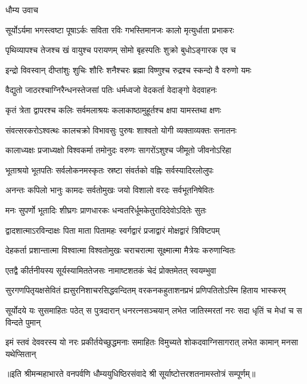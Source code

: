 

धौम्य उवाच

\twolineshloka
{सूर्योऽर्यमा भगस्त्वष्टा पूषाऽर्कः सविता रविः}
{गभस्तिमानजः कालो मृत्युर्धाता प्रभाकरः}

\twolineshloka
{पृथिव्यापश्च तेजश्च खं वायुश्च परायणम्}
{सोमो बृहस्पतिः शुक्रो बुधोऽङ्गारक एव च}

\twolineshloka
{इन्द्रो विवस्वान् दीप्तांशुः शुचिः शौरिः शनैश्चरः}
{ब्रह्मा विष्णुश्च रुद्रश्च स्कन्दो वै वरुणो यमः}

\twolineshloka
{वैद्युतो जाठरश्चाग्निरैन्धनस्तेजसां पतिः}
{धर्मध्वजो वेदकर्ता वेदाङ्गो वेदवाहनः}

\twolineshloka
{कृतं त्रेता द्वापरश्च कलिः सर्वमलाश्रयः}
{कलाकाष्ठामुहूर्तश्च क्षपा यामस्तथा क्षणः}

\twolineshloka
{संवत्सरकरोऽश्वत्थः कालचक्रो विभावसुः}
{पुरुषः शाश्वतो योगी व्यक्ताव्यक्तः सनातनः}

\twolineshloka
{कालाध्यक्षः प्रजाध्यक्षो विश्वकर्मा तमोनुदः}
{वरुणः सागरोंऽशुश्च जीमूतो जीवनोऽरिहा}

\twolineshloka
{भूताश्रयो भूतपतिः सर्वलोकनमस्कृतः}
{स्रष्टा संवर्तको वह्निः सर्वस्यादिरलोलुपः}

\twolineshloka
{अनन्तः कपिलो भानुः कामदः सर्वतोमुखः}
{जयो विशालो वरदः सर्वभूतनिषेवितः}

\twolineshloka
{मनः सुपर्णो भूतादिः शीघ्रगः प्राणधारकः}
{धन्वतरिर्धूमकेतुरादिदेवोऽदितेः सुतः}

\twolineshloka
{द्वादशात्माऽरविन्दाक्षः पिता माता पितामहः}
{स्वर्गद्वारं प्रजाद्वारं मोक्षद्वारं त्रिविष्टपम्}

\twolineshloka
{देहकर्ता प्रशान्तात्मा विश्वात्मा विश्वतोमुखः}
{चराचरात्मा सूक्ष्मात्मा मैत्रेयः करुणान्वितः}

\twolineshloka
{एतद्वै कीर्तनीयस्य सूर्यस्यामिततेजसः}
{नामाष्टशतकं चेदं प्रोक्तमेतत् स्वयम्भुवा}

\twolineshloka
{सुरगणपितृयक्षसेवितं ह्यसुरनिशाचरसिद्धवन्दितम्}
{वरकनकहुताशनप्रभं प्रणिपतितोऽस्मि हिताय भास्करम्}

\fourlineindentedshloka
{सूर्योदये यः सुसमाहितः पठेत्}
{स पुत्रदारान् धनरत्नसञ्चयान्}
{लभेत जातिस्मरतां नरः सदा}
{धृतिं च मेधां च स विन्दते पुमान्}

\fourlineindentedshloka
{इमं स्तवं देववरस्य यो नरः}
{प्रकीर्तयेच्छुद्धमनाः समाहितः}
{विमुच्यते शोकदवाग्निसागरात्}
{लभेत कामान् मनसा यथेप्सितान्}

॥इति श्रीमन्महाभारते वनपर्वणि धौम्ययुधिष्ठिरसंवादे श्री सूर्याष्टोत्तरशतनामस्तोत्रं सम्पूर्णम्॥
